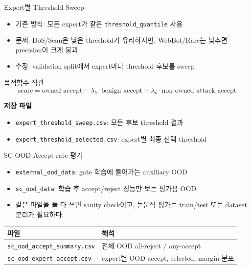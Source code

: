 \documentclass[aspectratio=169]{beamer}
\begin{document}
\begin{frame}{Expert별 Threshold Sweep}
\begin{itemize}
  \item 기존 방식: 모든 expert가 같은 \texttt{threshold\_quantile} 사용
  \item 문제: DoS/Scan은 낮은 threshold가 유리하지만, WebBot/Rare는 낮추면 precision이 크게 붕괴
  \item 수정: validation split에서 expert마다 threshold 후보를 sweep
\end{itemize}

\vspace{0.3em}
\begin{block}{목적함수 직관}
\[
  \text{score}
  = \text{owned accept}
  - \lambda_b \cdot \text{benign accept}
  - \lambda_o \cdot \text{non-owned attack accept}
\]
\end{block}

\vspace{0.3em}
\textbf{저장 파일}
\begin{itemize}
  \item \texttt{expert\_threshold\_sweep.csv}: 모든 후보 threshold 결과
  \item \texttt{expert\_threshold\_selected.csv}: expert별 최종 선택 threshold
\end{itemize}
\end{frame}

\begin{frame}{SC-OOD Accept-rate 평가}
\begin{itemize}
  \item \texttt{external\_ood\_data}: gate 학습에 들어가는 auxiliary OOD
  \item \texttt{sc\_ood\_data}: 학습 후 accept/reject 성능만 보는 평가용 OOD
  \item 같은 파일을 둘 다 쓰면 sanity check이고, 논문식 평가는 train/test 또는 dataset 분리가 필요하다.
\end{itemize}

\vspace{0.4em}
\begin{center}
\begin{tabular}{ll}
\toprule
파일 & 해석 \\
\midrule
\texttt{sc\_ood\_accept\_summary.csv} & 전체 OOD all-reject / any-accept \\
\texttt{sc\_ood\_expert\_accept.csv} & expert별 OOD accept, selected, margin 분포 \\
\bottomrule
\end{tabular}
\end{center}
\end{frame}
\end{document}
